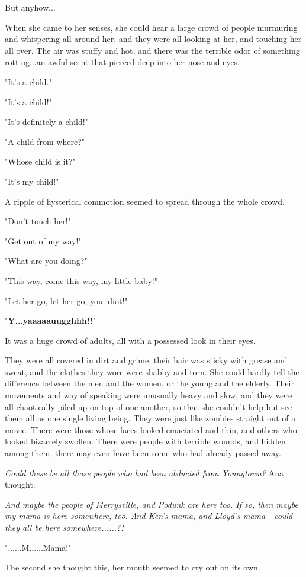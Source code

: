 \documentclass[
]{article}
\begin{document}
But anyhow...

When she came to her senses, she could hear a large crowd of people
murmuring and whispering all around her, and they were all looking at
her, and touching her all over. The air was stuffy and hot, and there
was the terrible odor of something rotting...an awful scent that pierced
deep into her nose and eyes.

"It's a child."

"It's a child!"

"It's definitely a child!"

"A child from where?"

"Whose child is it?"

"It's my child!"

A ripple of hysterical commotion seemed to spread through the whole
crowd.

"Don't touch her!"

"Get out of my way!"

"What are you doing?"

"This way, come this way, my little baby!"

"Let her go, let her go, you idiot!"

"\textbf{Y...yaaaaauugghhh!!}"

It was a huge crowd of adults, all with a possessed look in their eyes.

They were all covered in dirt and grime, their hair was sticky with
grease and sweat, and the clothes they wore were shabby and torn. She
could hardly tell the difference between the men and the women, or the
young and the elderly. Their movements and way of speaking were
unusually heavy and slow, and they were all chaotically piled up on top
of one another, so that she couldn't help but see them all as one single
living being. They were just like zombies straight out of a movie. There
were those whose faces looked emaciated and thin, and others who looked
bizarrely swollen. There were people with terrible wounds, and hidden
among them, there may even have been some who had already passed away.

\emph{Could these be all those people who had been abducted from
Youngtown?} Ana thought.

\emph{And maybe the people of Merrysville, and Podunk are here too. If
so, then maybe my mama is here somewhere, too. And Ken's mama, and
Lloyd's mama - could they all be here somewhere......?!}

"......M......Mama!"

The second she thought this, her mouth seemed to cry out on its own.
\end{document}
